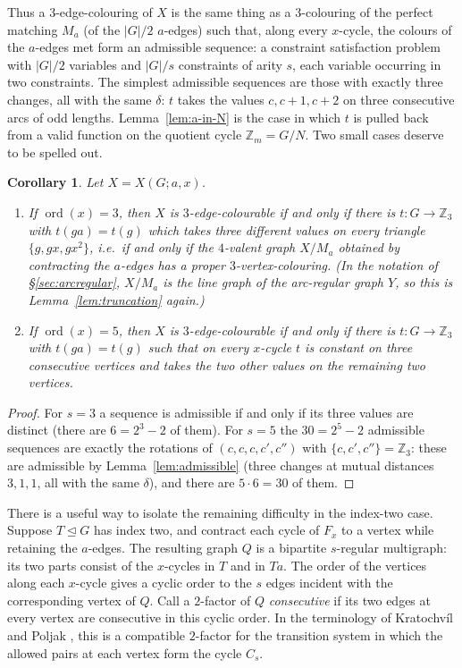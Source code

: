 \documentclass[11pt,a4paper]{article}
\newtheorem{corollary}[theorem]{Corollary}
\theoremstyle{definition}
\theoremstyle{remark}
\newcommand{\ord}{\operatorname{ord}}
\newcommand{\ZZ}{\mathbb{Z}}
\newcommand{\X}[3]{X(#1;#2,#3)}
\begin{document}
Thus a $3$-edge-colouring of $X$ is the same thing as a $3$-colouring of the perfect matching $M_a$ (of the $|G|/2$ $a$-edges) such that, along every $x$-cycle, the colours of the $a$-edges met form an admissible sequence: a constraint satisfaction problem with $|G|/2$ variables and $|G|/s$ constraints of arity $s$, each variable occurring in two constraints.  The simplest admissible sequences are those with exactly three changes, all with the same $\delta$: $t$ takes the values $c,c+1,c+2$ on three consecutive arcs of odd lengths.  Lemma~\ref{lem:a-in-N} is the case in which $t$ is pulled back from a valid function on the quotient cycle $\ZZ_m=G/N$.  Two small cases deserve to be spelled out.

\begin{corollary}\label{cor:s35}
Let $X=\X{G}{a}{x}$.
\begin{enumerate}[label=\textup{(\alph*)}]
\item If $\ord(x)=3$, then $X$ is $3$-edge-colourable if and only if there is $t\colon G\to\ZZ_3$ with $t(ga)=t(g)$ which takes three different values on every triangle $\{g,gx,gx^2\}$, i.e.\ if and only if the $4$-valent graph $X/M_a$ obtained by contracting the $a$-edges has a proper $3$-vertex-colouring.  \textup{(}In the notation of \S\ref{sec:arcregular}, $X/M_a$ is the line graph of the arc-regular graph $Y$, so this is Lemma~\ref{lem:truncation} again.\textup{)}
\item If $\ord(x)=5$, then $X$ is $3$-edge-colourable if and only if there is $t\colon G\to\ZZ_3$ with $t(ga)=t(g)$ such that on every $x$-cycle $t$ is constant on three consecutive vertices and takes the two other values on the remaining two vertices.
\end{enumerate}
\end{corollary}
\begin{proof}
For $s=3$ a sequence is admissible if and only if its three values are distinct (there are $6=2^3-2$ of them).  For $s=5$ the $30=2^5-2$ admissible sequences are exactly the rotations of $(c,c,c,c',c'')$ with $\{c,c',c''\}=\ZZ_3$: these are admissible by Lemma~\ref{lem:admissible} (three changes at mutual distances $3,1,1$, all with the same $\delta$), and there are $5\cdot 6=30$ of them.
\end{proof}

There is a useful way to isolate the remaining difficulty in the index-two case.  Suppose $T\trianglelefteq G$ has index two, and contract each cycle of $F_x$ to a vertex while retaining the $a$-edges.  The resulting graph $Q$ is a bipartite $s$-regular multigraph: its two parts consist of the $x$-cycles in $T$ and in $Ta$.  The order of the vertices along each $x$-cycle gives a cyclic order to the $s$ edges incident with the corresponding vertex of $Q$.  Call a $2$-factor of $Q$ \emph{consecutive} if its two edges at every vertex are consecutive in this cyclic order.  In the terminology of Kratochv\'il and Poljak \cite{KratochvilPoljak92}, this is a compatible $2$-factor for the transition system in which the allowed pairs at each vertex form the cycle $C_s$.
\end{document}

